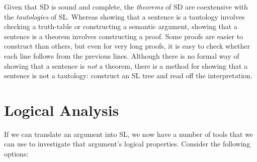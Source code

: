 Given that SD is sound and complete, the \emph{theorems} of SD are coextensive with the \emph{tautologies} of SL.
Whereas showing that a sentence is a tautology involves checking a truth-table or constructing a semantic argument, showing that a sentence is a theorem involves constructing a proof.
Some proofs are easier to construct than others, but even for very long proofs, it is easy to check whether each line follows from the previous lines.
Although there is no formal way of showing that a sentence is \emph{not} a theorem, there is a method for showing that a sentence is not a tautology: construct an SL tree and read off the interpretation.


\section{Logical Analysis}

If we can translate an argument into SL, we now have a number of tools that we can use to investigate that argument's logical properties.
Consider the following options:

